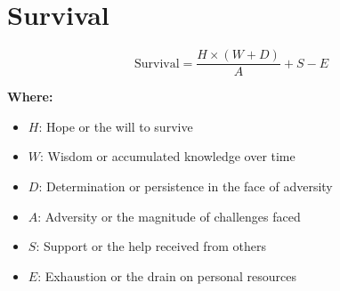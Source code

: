 \chapter{Survival}

\begin{equation}
\text{Survival} = \frac{H \times (W + D)}{A} + S - E
\end{equation}

\textbf{Where:}

\begin{itemize}
    \item $H$: Hope or the will to survive
    \item $W$: Wisdom or accumulated knowledge over time
    \item $D$: Determination or persistence in the face of adversity
    \item $A$: Adversity or the magnitude of challenges faced
    \item $S$: Support or the help received from others
    \item $E$: Exhaustion or the drain on personal resources
\end{itemize}